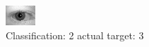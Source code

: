 \begin{figure}[h!]
\begin{center}
\includegraphics[width=0.60\columnwidth]{figures/ID668_class_2_target_3.png}
\end{center}
\caption{ Classification: 2 actual target: 3}
\label{fig:ID668_class_2_target_3}
\end{figure}
